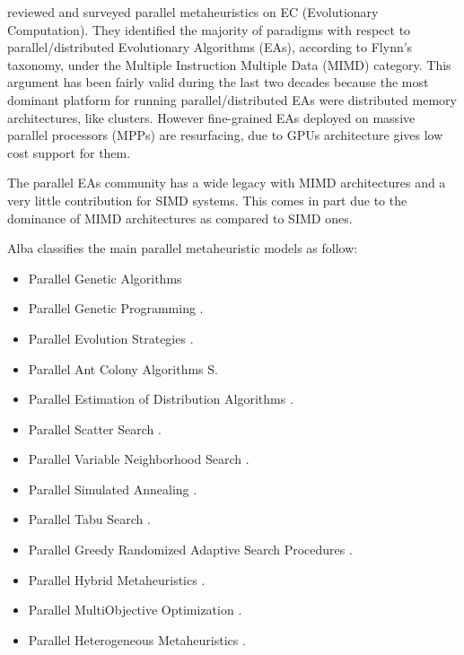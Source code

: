 \documentclass[Afour,sageh,times]{sagej}
\begin{document}
 \cite{Alba2005book} reviewed and surveyed parallel metaheuristics on EC (Evolutionary Computation). They identified the majority of paradigms with respect to parallel/distributed Evolutionary Algorithms (EAs), according to Flynn's taxonomy, under the Multiple Instruction Multiple Data (MIMD) category. This argument has been fairly valid during the last two decades because the most dominant platform for running parallel/distributed EAs were distributed memory architectures, like clusters. However fine-grained EAs deployed on massive parallel processors (MPPs) are resurfacing, due to GPUs architecture gives low cost support for them.

The parallel EAs community has a wide legacy with MIMD architectures and a very little contribution for SIMD systems. This comes in part due to the dominance of MIMD architectures as compared to SIMD ones.

Alba classifies the main parallel metaheuristic models as follow: %
\begin{itemize}
\item Parallel Genetic Algorithms \citep{Cantu-Paz98asurvey} %
\item Parallel Genetic Programming \citep{springerlink:10.1023_A:1021873026259}.
\item Parallel Evolution Strategies \citep{Rudolph92parallelapproaches}.
\item Parallel Ant Colony Algorithms S\citep{ParallelAntColony}.
\item Parallel Estimation of Distribution Algorithms  \citep{springerlink:10.1007_3_540_32494_1_7}.
\item Parallel Scatter Search \citep{GarciaLopez2003575}.
\item Parallel Variable Neighborhood Search \citep{Garcia_lopez_theparallel}.
\item Parallel Simulated Annealing \citep{Genetic_parallelsimulated} .
\item Parallel Tabu Search \citep{Crainic97towardsa}.
\item Parallel Greedy Randomized Adaptive Search Procedures \citep{Resendeparallelgreedy}.
\item Parallel Hybrid Metaheuristics  \citep{Cotta05e:parallel}. 
\item Parallel MultiObjective Optimization  \citep{Nebro07mocell:a}.
\item Parallel Heterogeneous Metaheuristics  \citep{ANL04}. 
\end{itemize}
\end{document}
